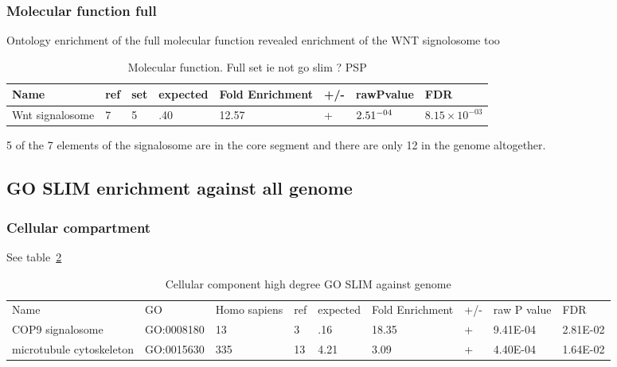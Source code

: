 \subsubsection{Molecular function full}
Ontology enrichment of the full molecular function revealed enrichment of the WNT signolosome too
\begin{table}
\centering
\begin{adjustbox}{max width=\textwidth}
\begin{tabular}{l l l l l l l l}
Name  &ref & set&	expected &	Fold Enrichment &	+/-	&rawPvalue&FDR\\
\hline
Wnt signalosome& 	7& 	5& 	.40& 	12.57&	+ &	$2.51\time10^{-04}$& 	$8.15\times10^{-03}$\\ 
\end{tabular}
\end{adjustbox}
\caption{Molecular function. Full set ie not go slim ? PSP}
\label{tab:Molecular function. Full set ie not go slim ? PSP}
\end{table}

5 of the 7 elements of the signalosome are in the core segment and there are only 12 in the genome altogether.

\subsection{GO SLIM enrichment against all genome} 

\subsubsection{Cellular compartment }
See table~\ref{tab:Cellular component high degree GO SLIM against genome}
\begin{table}
\centering
\begin{adjustbox}{max width=\textwidth}
\begin{tabular}{lllllllll}
  Name & GO&	Homo sapiens &ref &	expected &	Fold Enrichment &	+/-	&raw P value&FDR\\
  COP9 signalosome&GO:0008180&	13&	3&	.16&	18.35&	+&	9.41E-04&	2.81E-02\\
  microtubule cytoskeleton &GO:0015630&	335&	13&	4.21&	3.09&	+&	4.40E-04&	1.64E-02\\
\end{tabular}
\end{adjustbox}
\caption{Cellular component high degree GO SLIM against genome}
\label{tab:Cellular component high degree GO SLIM against genome}
\end{table}

